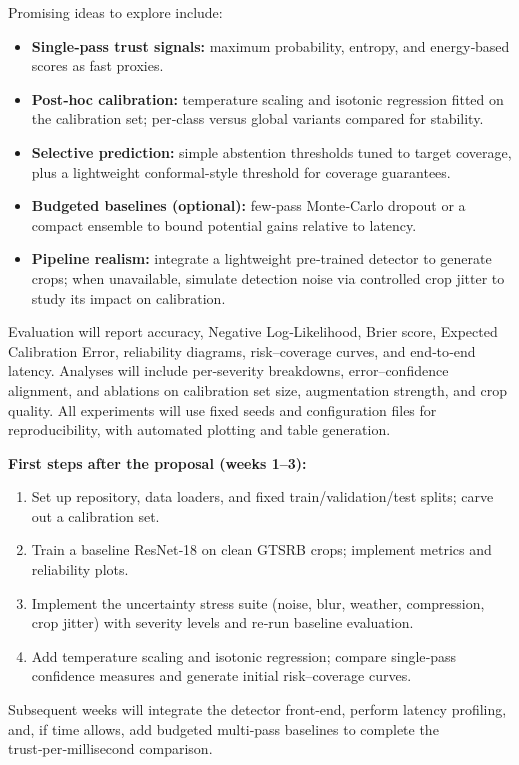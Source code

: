 \documentclass[11pt,a4paper]{article}
\begin{document}
Promising ideas to explore include:
\begin{itemize}
  \item \textbf{Single‑pass trust signals:} maximum probability, entropy, and energy‑based scores as fast proxies.
  \item \textbf{Post‑hoc calibration:} temperature scaling and isotonic regression fitted on the calibration set; per‑class versus global variants compared for stability.
  \item \textbf{Selective prediction:} simple abstention thresholds tuned to target coverage, plus a lightweight conformal-style threshold for coverage guarantees.
  \item \textbf{Budgeted baselines (optional):} few‑pass Monte‑Carlo dropout or a compact ensemble to bound potential gains relative to latency.
  \item \textbf{Pipeline realism:} integrate a lightweight pre‑trained detector to generate crops; when unavailable, simulate detection noise via controlled crop jitter to study its impact on calibration.
\end{itemize}

Evaluation will report accuracy, Negative Log‑Likelihood, Brier score, Expected Calibration Error, reliability diagrams, risk–coverage curves, and end‑to‑end latency. Analyses will include per‑severity breakdowns, error–confidence alignment, and ablations on calibration set size, augmentation strength, and crop quality. All experiments will use fixed seeds and configuration files for reproducibility, with automated plotting and table generation.

\textbf{First steps after the proposal (weeks 1–3):}
\begin{enumerate}
  \item Set up repository, data loaders, and fixed train/validation/test splits; carve out a calibration set.
  \item Train a baseline ResNet‑18 on clean GTSRB crops; implement metrics and reliability plots.
  \item Implement the uncertainty stress suite (noise, blur, weather, compression, crop jitter) with severity levels and re‑run baseline evaluation.
  \item Add temperature scaling and isotonic regression; compare single‑pass confidence measures and generate initial risk–coverage curves.
\end{enumerate}

Subsequent weeks will integrate the detector front‑end, perform latency profiling, and, if time allows, add budgeted multi‑pass baselines to complete the trust‑per‑millisecond comparison.
\end{document}
